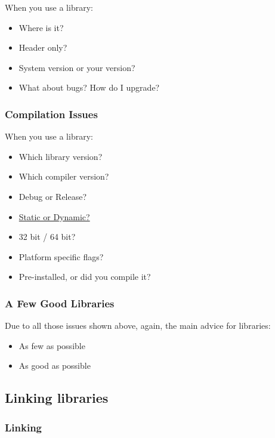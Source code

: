 When you use a library:

\begin{itemize}
\itemsep1pt\parskip0pt
\item
  Where is it?
\item
  Header only?
\item
  System version or your version?
\item
  What about bugs? How do I upgrade?
\end{itemize}

\subsubsection{Compilation Issues}\label{compilation-issues}

When you use a library:

\begin{itemize}
\itemsep1pt\parskip0pt
\item
  Which library version?
\item
  Which compiler version?
\item
  Debug or Release?
\item
  \href{http://www.learncpp.com/cpp-tutorial/a1-static-and-dynamic-libraries/}{Static
  or Dynamic?}
\item
  32 bit / 64 bit?
\item
  Platform specific flags?
\item
  Pre-installed, or did you compile it?
\end{itemize}

\subsubsection{A Few Good Libraries}\label{a-few-good-libraries}

Due to all those issues shown above, again, the main advice for
libraries:

\begin{itemize}
\itemsep1pt\parskip0pt
\item
  As few as possible
\item
  As good as possible
\end{itemize}

\subsection{Linking libraries}\label{linking-libraries}

\subsubsection{Linking}\label{linking}

